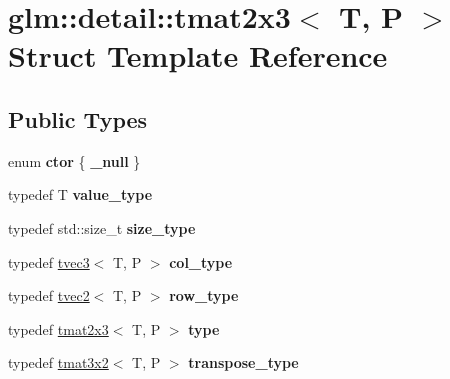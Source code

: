 \hypertarget{structglm_1_1detail_1_1tmat2x3}{}\section{glm\+:\+:detail\+:\+:tmat2x3$<$ T, P $>$ Struct Template Reference}
\label{structglm_1_1detail_1_1tmat2x3}
\subsection*{Public Types}
\begin{DoxyCompactItemize}
\item 
enum {\bfseries ctor} \{ {\bfseries \+\_\+null}
 \}\hypertarget{structglm_1_1detail_1_1tmat2x3_ad7092896f5d4dad36473ed142687f571}{}\label{structglm_1_1detail_1_1tmat2x3_ad7092896f5d4dad36473ed142687f571}

\item 
typedef T {\bfseries value\+\_\+type}\hypertarget{structglm_1_1detail_1_1tmat2x3_a956bc7b781faea2cf8a47f9150e035f4}{}\label{structglm_1_1detail_1_1tmat2x3_a956bc7b781faea2cf8a47f9150e035f4}

\item 
typedef std\+::size\+\_\+t {\bfseries size\+\_\+type}\hypertarget{structglm_1_1detail_1_1tmat2x3_ab27aa4557eb2ffaf9931bcee48823cde}{}\label{structglm_1_1detail_1_1tmat2x3_ab27aa4557eb2ffaf9931bcee48823cde}

\item 
typedef \hyperlink{structglm_1_1detail_1_1tvec3}{tvec3}$<$ T, P $>$ {\bfseries col\+\_\+type}\hypertarget{structglm_1_1detail_1_1tmat2x3_aa68634b0c048f0010844a45aa5e9bdab}{}\label{structglm_1_1detail_1_1tmat2x3_aa68634b0c048f0010844a45aa5e9bdab}

\item 
typedef \hyperlink{structglm_1_1detail_1_1tvec2}{tvec2}$<$ T, P $>$ {\bfseries row\+\_\+type}\hypertarget{structglm_1_1detail_1_1tmat2x3_ae86cbe307097a27d0d6965b41e8f7ae3}{}\label{structglm_1_1detail_1_1tmat2x3_ae86cbe307097a27d0d6965b41e8f7ae3}

\item 
typedef \hyperlink{structglm_1_1detail_1_1tmat2x3}{tmat2x3}$<$ T, P $>$ {\bfseries type}\hypertarget{structglm_1_1detail_1_1tmat2x3_ac22545a54f77e4e0915042109672179f}{}\label{structglm_1_1detail_1_1tmat2x3_ac22545a54f77e4e0915042109672179f}

\item 
typedef \hyperlink{structglm_1_1detail_1_1tmat3x2}{tmat3x2}$<$ T, P $>$ {\bfseries transpose\+\_\+type}\hypertarget{structglm_1_1detail_1_1tmat2x3_aba2a62afb75e30c53886be45955591ae}{}\label{structglm_1_1detail_1_1tmat2x3_aba2a62afb75e30c53886be45955591ae}

\end{DoxyCompactItemize}

